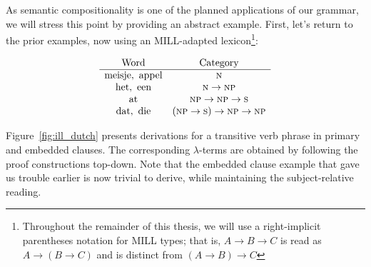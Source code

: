 As semantic compositionality is one of the planned applications of our grammar, we will stress this point by providing an abstract example.
First, let's return to the prior examples, now using an MILL-adapted lexicon\footnote{Throughout the remainder of this thesis, we will use a right-implicit parentheses notation for MILL types; that is, $A\to B \to C$ is read as $A\to (B \to C)$ and is distinct from $(A\to B) \to C$}:

 \[
 \begin{array}{cc}
 \text{Word} & \text{Category} \\
 \hline
 \text{meisje}, \ \text{appel} & \textsc{n} \\
 \text{het}, \ \text{een}  & \textsc{n} \to \textsc{np}\\
 \text{at}  & \textsc{np} \to \textsc{np} \to \textsc{s}\\ 
 \text{dat}, \ \text{die} & (\textsc{np}\to \textsc{s})\to \textsc{np} \to \textsc{np} \\
 \end{array}
 \]

Figure~\ref{fig:ill_dutch} presents derivations for a transitive verb phrase in primary and embedded clauses.
The corresponding $\lambda$-terms are obtained by following the proof constructions top-down.
Note that the embedded clause example that gave us trouble earlier is now trivial to derive, while maintaining the subject-relative reading.

